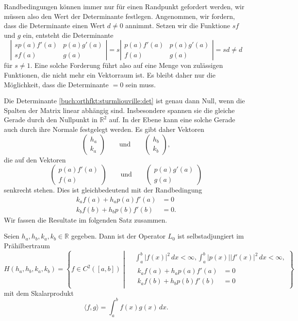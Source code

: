 Randbedingungen können immer nur für einen Randpunkt gefordert
werden, wir müssen also den Wert der Determinante festlegen.
Angenommen, wir fordern, dass die Determinante einen Wert
$d\ne 0$ annimmt.
Setzen wir die Funktione $s f$ und $g$ ein,
entsteht die Determinante
\[
\left|\begin{matrix}
s p(a)f'(a)&p(a)g'(a) \\
s f(a) &g(a)
\end{matrix}\right|
=
s
\left|\begin{matrix}
p(a)f'(a)&p(a)g'(a) \\
f(a) &g(a)
\end{matrix}\right|
=
s d \ne d
\]
für $s \ne 1$.
Eine solche Forderung führt also auf eine Menge von zulässigen Funktionen,
die nicht mehr ein Vektorraum ist.
Es bleibt daher nur die Möglichkeit, dass die Determinante $=0$ sein muss.

Die Determinante 
\eqref{buch:orthfkt:sturmliouville:det}
ist genau dann Null, wenn die Spalten der Matrix linear abhängig sind.
Insbesondere spannen sie die gleiche Gerade durch den Nullpunkt
in $\mathbb{R}^2$ auf.
In der Ebene kann eine solche Gerade auch durch ihre Normale festgelegt
werden.
Es gibt daher Vektoren
\[
\begin{pmatrix}
h_a\\
k_a
\end{pmatrix}
\qquad\text{und}\qquad
\begin{pmatrix}
h_b\\
k_b
\end{pmatrix},
\]
die auf den Vektoren
\[
\begin{pmatrix}
p(a)f'(a)\\
f(a)
\end{pmatrix}
\qquad\text{und}\qquad
\begin{pmatrix}
p(a)g'(a)\\
g(a)
\end{pmatrix}
\]
senkrecht stehen.
Dies ist gleichbedeutend mit der Randbedingung
\begin{align*}
k_af(a) + h_ap(a)f'(a)&=0
\\
k_bf(b) + h_bp(b)f'(b)&=0.
\end{align*}
Wir fassen die Resultate im folgenden Satz zusammen.

\begin{satz}
Seien $h_a, h_b, k_a, k_b\in \mathbb{R}$ gegeben.
Dann ist der Operator $L_0$ ist selbstadjungiert im Prähilbertraum
\begin{equation}
H(h_a,h_b,k_a,k_b)
=
\left\{
f \in C^2([a,b])
\;
\left|
\;
\begin{aligned}
&\int_a^b |f(x)|^2\,dx < \infty,
\int_a^b |p(x)| |f'(x)|^2\,dx < \infty,
\\
&
\begin{aligned}
k_af(a) + h_ap(a)f'(a) &= 0 \\
k_af(b) + h_bp(b)f'(b) &= 0 
\end{aligned}
\end{aligned}
\right.
\right\}
\label{buch:orthfkt:sturmliouvill:ph}
\end{equation}
mit dem Skalarprodukt
\[
\langle f,g\rangle = \int_a^b f(x)g(x)\,dx.
\]
\end{satz}

